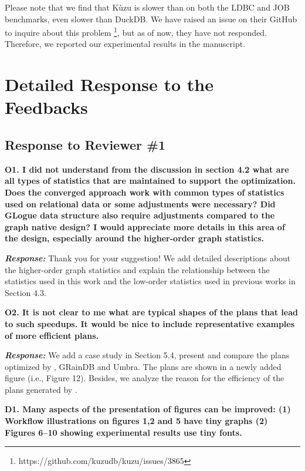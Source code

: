 Please note that we find that K\`uzu is slower than \name on both the LDBC and JOB benchmarks, even slower than DuckDB. We have raised an issue on their GitHub to inquire about this problem \footnote{https://github.com/kuzudb/kuzu/issues/3865}, but as of now, they have not responded. Therefore, we reported our experimental results in the manuscript.

\section{Detailed Response to the Feedbacks}
\label{sec:response}
\subsection{Response to Reviewer \#1}

\textbf{O1. I did not understand from the discussion in section 4.2 what are all types of statistics that are maintained to support the optimization. Does the converged approach work with common types of statistics used on relational data or some adjustments were necessary? Did GLogue data structure also require adjustments compared to the graph native design? I would appreciate more details in this area of the design, especially around the higher-order graph statistics.}

\textbf{\textit{Response: }}
Thank you for your suggestion! We add detailed descriptions about the higher-order graph statistics and explain the relationship between the statistics used in this work and the low-order statistics used in previous works in Section 4.3.



\textbf{O2. It is not clear to me what are typical shapes of the plans that lead to such speedups. It would be nice to include representative examples of more efficient plans.}

\textbf{\textit{Response: }}
We add a case study in Section 5.4, present and compare the plans optimized by \name, GRainDB and Umbra. 
The plans are shown in a newly added figure (i.e., Figure 12). 
Besides, we analyze the reason for the efficiency of the plans generated by \name.


\textbf{D1. Many aspects of the presentation of figures can be improved: 
(1) Workflow illustrations on figures 1,2 and 5 have tiny graphs
(2) Figures 6--10 showing experimental results use tiny fonts.}

